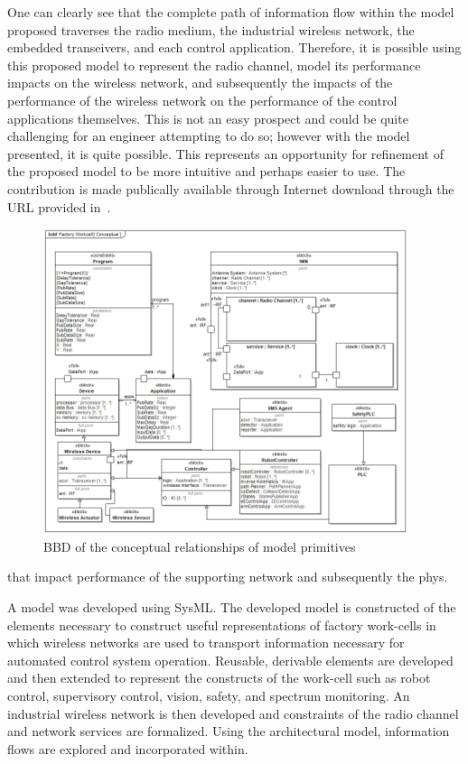 One can clearly see that the complete path of information flow within the model proposed traverses the radio medium, the industrial wireless network, the embedded transeivers, and each control application. Therefore, it is possible using this proposed model to represent the radio channel, model its performance impacts on the wireless network, and subsequently the impacts of the performance of the wireless network on the performance of the control applications themselves.  This is not an easy prospect and could be quite challenging for an engineer attempting to do so; however with the model presented, it is quite possible.  This represents an opportunity for refinement of the proposed model to be more intuitive and perhaps easier to use.  The contribution is made publically available through Internet download through the URL provided in~\cite{Candell2018SysML.DATA}.

\begin{figure}[!th]
	\centering
	\includegraphics[width=0.95\textwidth]{chapter-conclusions/images/Conceptual}
	\caption{BBD of the conceptual relationships of model primitives}
	\label{fig:concl:conceptual}
\end{figure}

 that impact performance of the supporting network and subsequently the phys.

A model was developed using SysML. The developed model is constructed of the elements necessary to construct useful representations of factory work-cells in which wireless networks are used to transport information necessary for automated control system operation.  Reusable, derivable elements are developed and then extended to represent the constructs of the work-cell such as robot control, supervisory control, vision, safety, and spectrum monitoring.  An industrial wireless network is then developed and constraints of the radio channel and network services are formalized. Using the architectural model, information flows are explored and incorporated within. 

